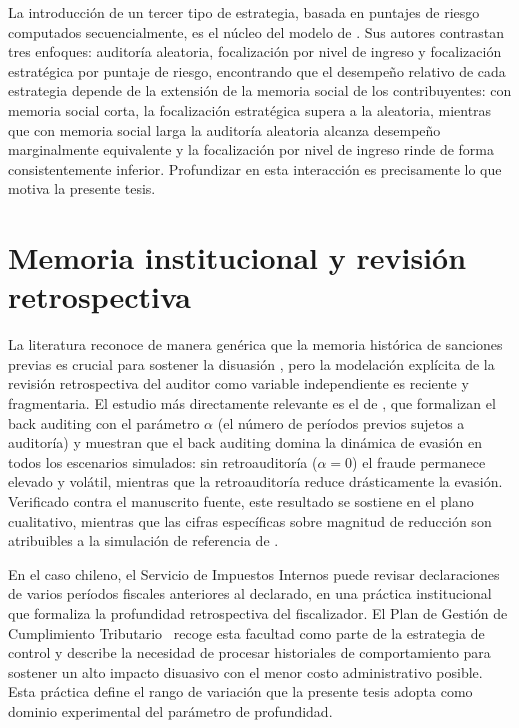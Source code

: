 La introducción de un tercer tipo de estrategia, basada en puntajes de riesgo computados secuencialmente, es el núcleo del modelo de \textcite{canessa2025tax}. Sus autores contrastan tres enfoques: auditoría aleatoria, focalización por nivel de ingreso y focalización estratégica por puntaje de riesgo, encontrando que el desempeño relativo de cada estrategia depende de la extensión de la memoria social de los contribuyentes: con memoria social corta, la focalización estratégica supera a la aleatoria, mientras que con memoria social larga la auditoría aleatoria alcanza desempeño marginalmente equivalente y la focalización por nivel de ingreso rinde de forma consistentemente inferior. Profundizar en esta interacción es precisamente lo que motiva la presente tesis.

\section{Memoria institucional y revisión retrospectiva}
\label{sec:edo-meminst}

La literatura reconoce de manera genérica que la memoria histórica de sanciones previas es crucial para sostener la disuasión \parencite{antunes2005tax, bloomquist2004multi, hashimzade2018using}, pero la modelación explícita de la revisión retrospectiva del auditor como variable independiente es reciente y fragmentaria. El estudio más directamente relevante es el de \textcite{hokamp2014dynamics}, que formalizan el back auditing con el parámetro $\alpha$ (el número de períodos previos sujetos a auditoría) y muestran que el back auditing domina la dinámica de evasión en todos los escenarios simulados: sin retroauditoría ($\alpha = 0$) el fraude permanece elevado y volátil, mientras que la retroauditoría reduce drásticamente la evasión. Verificado contra el manuscrito fuente, este resultado se sostiene en el plano cualitativo, mientras que las cifras específicas sobre magnitud de reducción son atribuibles a la simulación de referencia de \textcite{hokamp2010income}.

En el caso chileno, el Servicio de Impuestos Internos puede revisar declaraciones de varios períodos fiscales anteriores al declarado, en una práctica institucional que formaliza la profundidad retrospectiva del fiscalizador. El Plan de Gestión de Cumplimiento Tributario~\parencite{sii2026pgct} recoge esta facultad como parte de la estrategia de control y describe la necesidad de procesar historiales de comportamiento para sostener un alto impacto disuasivo con el menor costo administrativo posible. Esta práctica define el rango de variación que la presente tesis adopta como dominio experimental del parámetro de profundidad.

